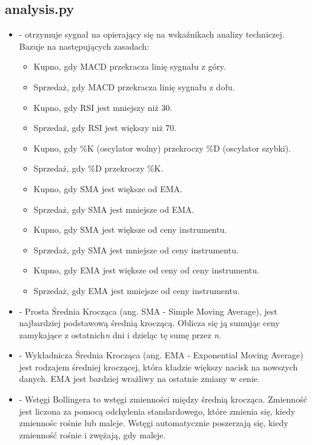 \documentclass[12pt]{article}
\begin{document}
		\subsection{analysis.py}\label{wskazniki}
		\begin{itemize}
			\item {} - otrzymuje sygnał na opierający się na wskaźnikach analizy techniczej.
			Bazuje na następujących zasadach:
			\begin{itemize}
				\item Kupno, gdy MACD przekracza linię sygnału z góry.
				\item Sprzedaż, gdy MACD przekracza linię sygnału z dołu.
				\item Kupno, gdy RSI jest mniejszy niż 30.
				\item Sprzedaż, gdy RSI jest większy niż 70.
				\item Kupno, gdy \%K (oscylator wolny) przekroczy \%D (oscylator szybki).
				\item Sprzedaż, gdy \%D przekroczy \%K.
				\item Kupno, gdy SMA jest większe od EMA.
				\item Sprzedaż, gdy SMA jest mniejsze od EMA.
				\item Kupno, gdy SMA jest większe od ceny instrumentu.
				\item Sprzedaż, gdy SMA jest mniejsze od ceny instrumentu.
				\item Kupno, gdy EMA jest większe od ceny od ceny instrumentu.
				\item Sprzedaż, gdy EMA jest mniejsze od ceny instrumentu.
			\end{itemize}
			\item {} - Prosta Średnia Krocząca (ang. SMA - Simple Moving Average), jest
			najbardziej podstawową średnią kroczącą.
			Oblicza się ją sumując ceny zamykające z ostatnich\textit{n} dni i dzieląc tę sumę przez \textit{n}.
			\item {} - Wykładnicza Średnia Krocząca (ang. EMA - Exponential Moving Average) jest rodzajem
			średniej kroczącej, która kładzie większy nacisk na nowszych danych.
			EMA jest bardziej wrażliwy na ostatnie zmiany w cenie.
			\item {} - Wstęgi Bollingera to wstęgi zmienności między średnią krocząca.
			Zmienność jest liczona za pomocą odchylenia standardowego, które zmienia się, kiedy
			zmiennośc rośnie lub maleje.
			Wstęgi automatycznie poszerzają się, kiedy zmienność rośnie i zwężają, gdy maleje.

\end{itemize}
\end{document}

